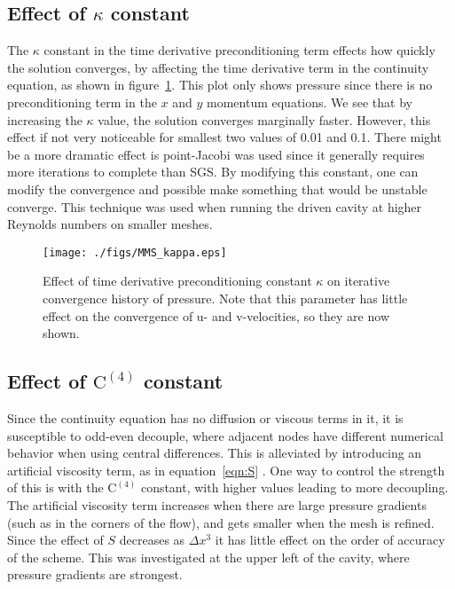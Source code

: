 \documentclass[10pt, letterpaper]{article}
\newcommand{\eqn}[1]{equation~\eqref{#1}}
\begin{document}
\clearpage


\subsection{Effect of $\kappa$ constant}

The $\kappa$ constant in the time derivative preconditioning term effects how 
quickly the solution converges, by affecting the time derivative term in the
continuity equation, as shown in figure~\ref{fig:MMS_kappa}.  This plot only
shows pressure since there is no preconditioning term in the $x$ and $y$
momentum equations.  We see
that by increasing the $\kappa$ value, the solution converges marginally faster.
However, this effect if not very noticeable for smallest two values of
0.01 and 0.1.  There might be a more dramatic effect is point-Jacobi was used
since it generally requires more iterations to complete than SGS.  By modifying
this constant, one can modify the convergence and possible make something that
would be unstable converge.  This technique was used when running the 
driven cavity at higher Reynolds numbers on smaller meshes.

\begin{figure}[h]
	\centering
	\texttt{[image: ./figs/MMS\_kappa.eps]}
	\caption{Effect of time derivative preconditioning constant $\kappa$ on
		iterative convergence history of pressure.  Note that this parameter has
		little effect on the convergence of u- and v-velocities, so they 
		are now shown.}
	\label{fig:MMS_kappa}
\end{figure}


\newpage

\subsection{Effect of $\mathrm{C^{(4)}}$ constant}

Since the continuity equation has no diffusion or viscous terms in it, it
is susceptible to odd-even decouple, where adjacent nodes have different numerical
behavior when using central differences.  This is alleviated by introducing
an artificial viscosity term, as in \eqn{eqn:S} \cite{choi1993application}.  
One way to control the
strength of this is with the $\mathrm{C^{(4)}}$ constant, with higher values leading
to more decoupling. The artificial viscosity term increases when there are large
pressure gradients (such as in the corners of the flow), and gets smaller when
the mesh is refined.  Since the effect of $S$ decreases as $\Delta x^3$ it has
little effect on the order of accuracy of the scheme.
This was investigated at the upper left of the cavity,
where pressure gradients are strongest.
\end{document}
